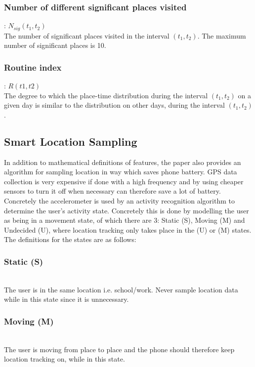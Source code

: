 \subsubsection*{Number of different significant places visited}: $N_{sig} (t_1, t_2)$\\
The number of significant places visited in the interval $(t_1, t_2)$. The maximum number of significant places is 10.\\

\subsubsection*{Routine index}: $R(t1, t2)$\\
The degree to which the place-time distribution during the interval $(t_1, t_2)$ on a given day is similar to the distribution on other days, during the interval $(t_1, t_2)$.

\subsection{Smart Location Sampling}
In addition to mathematical definitions of features, the paper also provides an algorithm for sampling location in way which saves phone battery. GPS data collection is very expensive if done with a high frequency and by using cheaper sensors to turn it off when necessary can therefore save a lot of battery. Concretely the accelerometer is used by an activity recognition algorithm to determine the user's activity state. Concretely this is done by modelling the user as being in a movement state, of which there are 3: Static (S), Moving (M) and Undecided (U), where location tracking only takes place in the (U) or (M) states. \\

The definitions for the states are as follows:\\

\subsubsection*{Static (S)}\\
The user is in the same location i.e. school/work. Never sample location data while in this state since it is unnecessary.\\

\subsubsection*{Moving (M)}\\
The user is moving from place to place and the phone should therefore keep location tracking on, while in this state.\\

